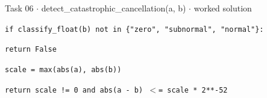 \documentclass[11pt]{article}
\begin{document}
\begin{keepsection}
\begin{workedbox}{Task 06 \ensuremath{\cdot} detect\_catastrophic\_cancellation(a, b) \ensuremath{\cdot} worked solution}
\begin{enumerate}
\begin{tcolorbox}[colback=Paperblue,colframe=Paperblue,boxrule=0pt,arc=0pt,left=7pt,right=7pt,top=5pt,bottom=5pt]
\noindent\hspace*{1em}\texttt{if classify\_float(b) not in \{"zero", "subnormal", "normal"\}:}\par
\noindent\hspace*{3em}\texttt{return False}\par
\noindent\hspace*{1em}\texttt{scale = max(abs(a), abs(b))}\par
\noindent\hspace*{1em}\texttt{return scale != 0 and abs(a - b) \ensuremath{<}= scale * 2**-52}\par
\end{tcolorbox}
\end{enumerate}
\end{workedbox}

\end{keepsection}
\end{document}
